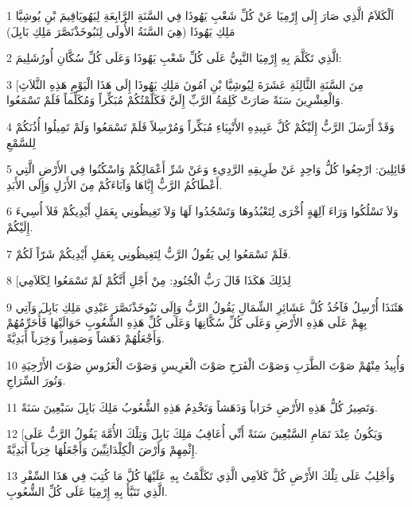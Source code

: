 \par 1 اَلْكَلاَمُ الَّذِي صَارَ إِلَى إِرْمِيَا عَنْ كُلِّ شَعْبِ يَهُوذَا فِي السَّنَةِ الرَّابِعَةِ لِيَهُويَاقِيمَ بْنِ يُوشِيَّا مَلِكِ يَهُوذَا (هِيَ السَّنَةُ الأُولَى لِنَبُوخَذْنَصَّرَ مَلِكِ بَابِلَ)
\par 2 الَّذِي تَكَلَّمَ بِهِ إِرْمِيَا النَّبِيُّ عَلَى كُلِّ شَعْبِ يَهُوذَا وَعَلَى كُلِّ سُكَّانِ أُورُشَلِيمَ:
\par 3 [مِنَ السَّنَةِ الثَّالِثَةِ عَشَرَةَ لِيُوشِيَّا بْنِ آمُونَ مَلِكِ يَهُوذَا إِلَى هَذَا الْيَوْمِ هَذِهِ الثَّلاَثِ وَالْعِشْرِينَ سَنَةً صَارَتْ كَلِمَةُ الرَّبِّ إِلَيَّ فَكَلَّمْتُكُمْ مُبَكِّراً وَمُكَلِّماً فَلَمْ تَسْمَعُوا.
\par 4 وَقَدْ أَرْسَلَ الرَّبُّ إِلَيْكُمْ كُلَّ عَبِيدِهِ الأَنْبِيَاءِ مُبَكِّراً وَمُرْسِلاً فَلَمْ تَسْمَعُوا وَلَمْ تَمِيلُوا أُذُنَكُمْ لِلسَّمْعِ
\par 5 قَائِلِينَ: ارْجِعُوا كُلُّ وَاحِدٍ عَنْ طَرِيقِهِ الرَّدِيءِ وَعَنْ شَرِّ أَعْمَالِكُمْ وَاسْكُنُوا فِي الأَرْضِ الَّتِي أَعْطَاكُمُ الرَّبُّ إِيَّاهَا وَآبَاءَكُمْ مِنَ الأَزَلِ وَإِلَى الأَبَدِ.
\par 6 وَلاَ تَسْلُكُوا وَرَاءَ آلِهَةٍ أُخْرَى لِتَعْبُدُوهَا وَتَسْجُدُوا لَهَا وَلاَ تَغِيظُونِي بِعَمَلِ أَيْدِيكُمْ فَلاَ أُسِيءَ إِلَيْكُمْ.
\par 7 فَلَمْ تَسْمَعُوا لِي يَقُولُ الرَّبُّ لِتَغِيظُونِي بِعَمَلِ أَيْدِيكُمْ شَرّاً لَكُمْ.
\par 8 [لِذَلِكَ هَكَذَا قَالَ رَبُّ الْجُنُودِ: مِنْ أَجْلِ أَنَّكُمْ لَمْ تَسْمَعُوا لِكَلاَمِي
\par 9 هَئَنَذَا أُرْسِلُ فَآخُذُ كُلَّ عَشَائِرِ الشِّمَالِ يَقُولُ الرَّبُّ وَإِلَى نَبُوخَذْنَصَّرَ عَبْدِي مَلِكِ بَابِلَ وَآتِي بِهِمْ عَلَى هَذِهِ الأَرْضِ وَعَلَى كُلِّ سُكَّانِهَا وَعَلَى كُلِّ هَذِهِ الشُّعُوبِ حَوَالَيْهَا فَأُحَرِّمُهُمْ وَأَجْعَلُهُمْ دَهَشاً وَصَفِيراً وَخِرَباً أَبَدِيَّةً.
\par 10 وَأُبِيدُ مِنْهُمْ صَوْتَ الطَّرَبِ وَصَوْتَ الْفَرَحِ صَوْتَ الْعَرِيسِ وَصَوْتَ الْعَرُوسِ صَوْتَ الأَرْحِيَةِ وَنُورَ السِّرَاجِ.
\par 11 وَتَصِيرُ كُلُّ هَذِهِ الأَرْضِ خَرَاباً وَدَهَشاً وَتَخْدِمُ هَذِهِ الشُّعُوبُ مَلِكَ بَابِلَ سَبْعِينَ سَنَةً.
\par 12 [وَيَكُونُ عِنْدَ تَمَامِ السَّبْعِينَ سَنَةً أَنِّي أُعَاقِبُ مَلِكَ بَابِلَ وَتِلْكَ الأُمَّةَ يَقُولُ الرَّبُّ عَلَى إِثْمِهِمْ وَأَرْضَ الْكِلْدَانِيِّينَ وَأَجْعَلُهَا خِرَباً أَبَدِيَّةً.
\par 13 وَأَجْلِبُ عَلَى تِلْكَ الأَرْضِ كُلَّ كَلاَمِي الَّذِي تَكَلَّمْتُ بِهِ عَلَيْهَا كُلَّ مَا كُتِبَ فِي هَذَا السِّفْرِ الَّذِي تَنَبَّأَ بِهِ إِرْمِيَا عَلَى كُلِّ الشُّعُوبِ.

